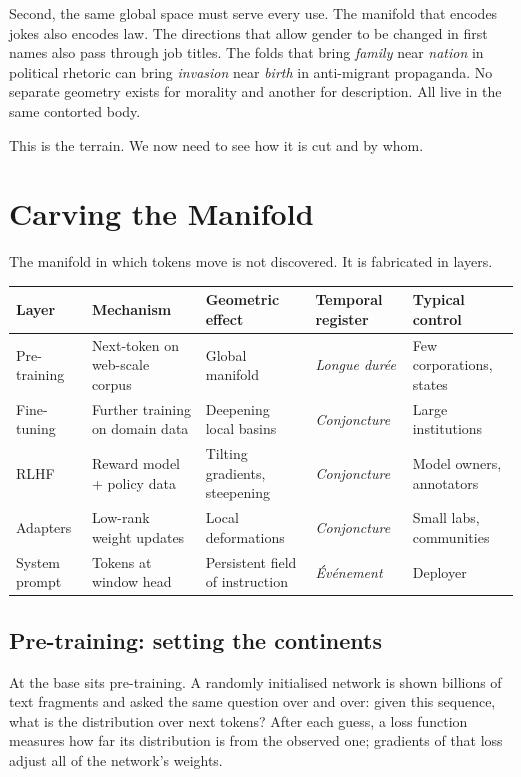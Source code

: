 \documentclass[12pt,a4paper]{article}
\begin{document}
Second, the same global space must serve every use. The manifold that encodes jokes also encodes law. The directions that allow gender to be changed in first names also pass through job titles. The folds that bring \emph{family} near \emph{nation} in political rhetoric can bring \emph{invasion} near \emph{birth} in anti-migrant propaganda. No separate geometry exists for morality and another for description. All live in the same contorted body.

This is the terrain. We now need to see how it is cut and by whom.

\section{Carving the Manifold}

The manifold in which tokens move is not discovered. It is fabricated in layers.

\begin{formalbox}[title={Layers of fabrication}]
\begin{tabular}{@{}lllll@{}}
\toprule
\textbf{Layer} & \textbf{Mechanism} & \textbf{Geometric effect} & \textbf{Temporal register} & \textbf{Typical control} \\
\midrule
Pre-training   & Next-token on web-scale corpus & Global manifold                & \emph{Longue dur\'{e}e} & Few corporations, states \\
Fine-tuning    & Further training on domain data& Deepening local basins         & \emph{Conjoncture}      & Large institutions        \\
RLHF           & Reward model + policy data     & Tilting gradients, steepening  & \emph{Conjoncture}      & Model owners, annotators  \\
Adapters       & Low-rank weight updates        & Local deformations             & \emph{Conjoncture}      & Small labs, communities   \\
System prompt  & Tokens at window head          & Persistent field of instruction& \emph{\'{E}v\'{e}nement} & Deployer                  \\
\bottomrule
\end{tabular}
\end{formalbox}

\subsection*{Pre-training: setting the continents}

At the base sits pre-training. A randomly initialised network is shown billions of text fragments and asked the same question over and over: given this sequence, what is the distribution over next tokens? After each guess, a loss function measures how far its distribution is from the observed one; gradients of that loss adjust all of the network's weights.
\end{document}
